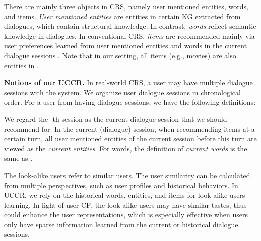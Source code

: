 \documentclass[sigconf,natbib=true]{acmart}
\begin{document}
There are mainly three objects in CRS, namely user mentioned entities, words, and items. \emph{User mentioned entities}  are entities in certain KG extracted from dialogues, which contain structural knowledge. In contrast, \emph{words}  reflect semantic knowledge in dialogues.
In conventional CRS, \emph{items}  are recommended mainly via user preferences learned from user mentioned entities and words in the current dialogue sessions \cite{zhou2020improving}. Note that in our setting, all items (e.g., movies) are also entities in  \cite{li2018towards,zhou2020towards}.

\noindent
\textbf{Notions of our UCCR.}
In real-world CRS, a user may have multiple dialogue sessions with the system. We organize user dialogue sessions in chronological order. For a user  from  having  dialogue sessions, we have the following definitions:

 We regard the -th session as the current dialogue session that we should recommend for. In the current (dialogue) session, when recommending items at a certain turn, all  user mentioned entities  of the current session before this turn are viewed as the \emph{current entities}. For words, the definition of \emph{current words}  is the same as .







The look-alike users refer to similar users. The user similarity can be calculated from multiple perspectives, such as user profiles and historical behaviors. In UCCR, we rely on the historical words, entities, and items for look-alike users learning.
In light of user-CF, the look-alike users may have similar tastes, thus could enhance the user representations, which is especially effective when users only have sparse information learned from the current or historical dialogue sessions.
\end{document}
